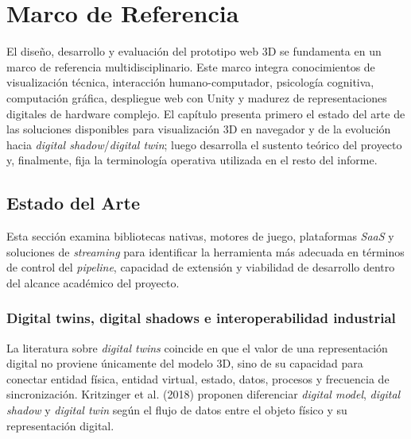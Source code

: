 
\section{Marco de Referencia}

El diseño, desarrollo y evaluación del prototipo web 3D se fundamenta en un marco de referencia multidisciplinario. Este marco integra conocimientos de visualización técnica, interacción humano-computador, psicología cognitiva, computación gráfica, despliegue web con Unity y madurez de representaciones digitales de hardware complejo. El capítulo presenta primero el estado del arte de las soluciones disponibles para visualización 3D en navegador y de la evolución hacia \textit{digital shadow}/\textit{digital twin}; luego desarrolla el sustento teórico del proyecto y, finalmente, fija la terminología operativa utilizada en el resto del informe.

\subsection{Estado del Arte}

Esta sección examina bibliotecas nativas, motores de juego, plataformas \textit{SaaS} y soluciones de \textit{streaming} para identificar la herramienta más adecuada en términos de control del \textit{pipeline}, capacidad de extensión y viabilidad de desarrollo dentro del alcance académico del proyecto.

\subsubsection{Digital twins, digital shadows e interoperabilidad industrial}

La literatura sobre \textit{digital twins} coincide en que el valor de una representación digital no proviene únicamente del modelo 3D, sino de su capacidad para conectar entidad física, entidad virtual, estado, datos, procesos y frecuencia de sincronización. Kritzinger et al. (2018) proponen diferenciar \textit{digital model}, \textit{digital shadow} y \textit{digital twin} según el flujo de datos entre el objeto físico y su representación digital.

